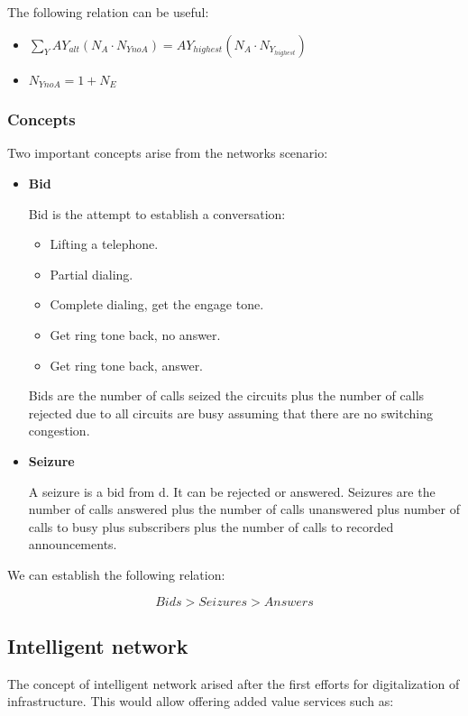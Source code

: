 \documentclass[../main.tex]{subfiles}
\begin{document}
The following relation can be useful:

\begin{itemize}
	\item $\sum_Y AY_{alt} (N_A \cdot N_{YnoA}) = AY_{highest} (N_A \cdot N_{Y_{highest}})$
	\item $N_{YnoA} = 1 + N_E$
\end{itemize}

\subsubsection{Concepts}

Two important concepts arise from the networks scenario:

\begin{itemize}
	\item {
		\textbf{Bid}

		Bid is the attempt to establish a conversation:

		\begin{itemize}
			\item Lifting a telephone.
			\item Partial dialing.
			\item Complete dialing, get the engage tone.
			\item Get ring tone back, no answer.
			\item Get ring tone back, answer.
		\end{itemize}

		Bids are the number of calls seized the circuits plus the number of calls rejected due to all circuits are busy assuming that there are no switching congestion.
	}
	\item {
		\textbf{Seizure}

		A seizure is a bid from d. It can be rejected or answered. Seizures are the number of calls answered plus the number of calls unanswered plus number of calls to busy plus subscribers plus the number of calls to recorded announcements.
	}
\end{itemize}

We can establish the following relation:

$$
	Bids > Seizures > Answers
$$

\subsection{Intelligent network}

The concept of intelligent network arised after the first efforts for digitalization of infrastructure. This would allow offering added value services such as:
\end{document}
